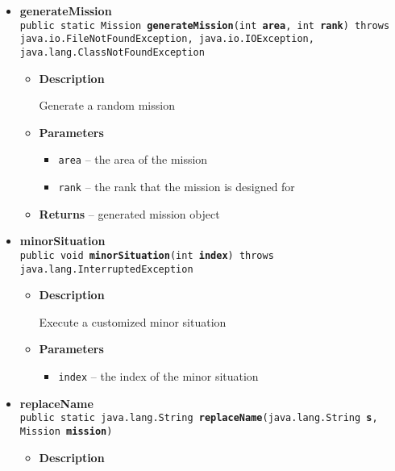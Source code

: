 {{{{{\begin{itemize}
{\begin{itemize}
{Generate a final Mission
}
\item{
{\bf  Parameters}
  \begin{itemize}
   \item{
\texttt{area} -- the area of the mission}
  \end{itemize}
}%
\item{{\bf  Returns} -- 
the generated final mission 
}%
\end{itemize}
}%
\item{ 
{\bf  generateMission}\\
\texttt{public static Mission\ {\bf  generateMission}(\texttt{int} {\bf  area},
\texttt{int} {\bf  rank}) throws java.io.FileNotFoundException, java.io.IOException, java.lang.ClassNotFoundException
\label{personOfInterest.Mission.generateMission(int, int)}}%
\begin{itemize}
\item{
{\bf  Description}

Generate a random mission
}
\item{
{\bf  Parameters}
  \begin{itemize}
   \item{
\texttt{area} -- the area of the mission}
   \item{
\texttt{rank} -- the rank that the mission is designed for}
  \end{itemize}
}%
\item{{\bf  Returns} -- 
generated mission object 
}%
\end{itemize}
}%
\item{ 
{\bf  minorSituation}\\
\texttt{public void\ {\bf  minorSituation}(\texttt{int} {\bf  index}) throws java.lang.InterruptedException
\label{personOfInterest.Mission.minorSituation(int)}}%
\begin{itemize}
\item{
{\bf  Description}

Execute a customized minor situation
}
\item{
{\bf  Parameters}
  \begin{itemize}
   \item{
\texttt{index} -- the index of the minor situation}
  \end{itemize}
}%
\end{itemize}
}%
\item{ 
{\bf  replaceName}\\
\texttt{public static java.lang.String\ {\bf  replaceName}(\texttt{java.lang.String} {\bf  s},
\texttt{Mission} {\bf  mission})
\label{personOfInterest.Mission.replaceName(java.lang.String, personOfInterest.Mission)}}%
\begin{itemize}
\item{
{\bf  Description}

}
\end{itemize}}
\end{itemize}}}}}}
